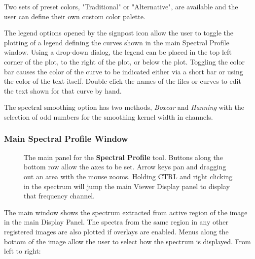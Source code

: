 Two sets of preset colors, "Traditional" or "Alternative", are available and the user can define
their own custom color palette.

The legend options opened by the signpost icon allow the user to toggle the plotting of
a legend defining the curves shown in the main Spectral Profile window. Using a drop-down 
dialog, the legend can be placed in the top left corner of the plot, to the right of the plot, or below the plot. 
Toggling the color bar causes the color of the curve to be indicated either via a short bar or using
the color of the text itself. Double click the names of the files or curves to edit the text shown for that curve 
by hand.

The spectral smoothing option has two methods, {\it Boxcar} and {\it
  Hanning} with the selection of odd numbers for the smoothing kernel
width in channels.

\subsubsection{Main Spectral Profile Window}
\label{section:display.image.specprof.mainwindow}

\begin{figure}[h!]
\begin{center}
\caption{\label{fig:viewer_specmain} The main panel for the {\bf Spectral Profile} tool. Buttons along
the bottom row allow the axes to be set. Arrow keys pan and dragging out an area with the mouse zooms.
Holding CTRL and right clicking in the spectrum will jump the main Viewer Display panel to display that
frequency channel.}
\hrulefill
\end{center}
\end{figure}

The main window shows the spectrum extracted from active region of the image in the 
main Display Panel. The spectra from the same region in any other registered images are also plotted 
if overlays are enabled.  Menus along the bottom of the image allow the user to select how the spectrum 
is displayed. From left to right:

